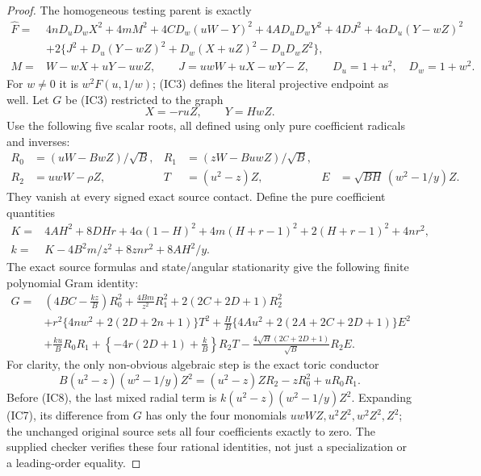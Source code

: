 \begin{proof}
The homogeneous testing parent is exactly
\begin{align*}
 \widehat F={}&4nD_uD_wX^2+4mM^2+4CD_w(uW-Y)^2
     +4AD_uD_wY^2+4DJ^2+4\alpha D_u(Y-wZ)^2\\
 &+2\{J^2+D_u(Y-wZ)^2+D_w(X+uZ)^2-D_uD_wZ^2\},\\
 M={}&W-wX+uY-uwZ,\qquad
 J=uwW+uX-wY-Z,
 \qquad D_u=1+u^2,\quad D_w=1+w^2.
                                                               \tag{IC3}
\end{align*}
For $w\ne0$ it is $w^2F(u,1/w)$; (IC3) defines the literal
projective endpoint as well. Let $G$ be (IC3) restricted to the graph
\[
                         X=-ruZ,\qquad Y=HwZ.
\tag{IC4}
\]
Use the following five scalar roots, all defined using only pure
coefficient radicals and inverses:
\begin{align*}
 R_0&=(uW-BwZ)/\sqrt B,&
 R_1&=(zW-BuwZ)/\sqrt B,\\
 R_2&=uwW-\rho Z,&
 T&=(u^2-z)Z,&
 E&=\sqrt{BH}\,(w^2-1/y)Z.                               \tag{IC5}
\end{align*}
They vanish at every signed exact source contact. Define the pure
coefficient quantities
\begin{align*}
 K={}&4AH^2+8DHr+4\alpha(1-H)^2
      +4m(H+r-1)^2+2(H+r-1)^2+4nr^2,\\
 k={}&K-4B^2m/z^2+8znr^2+8AH^2/y.                      \tag{IC6}
\end{align*}
The exact source formulas and state/angular stationarity give the
following finite polynomial Gram identity:
\begin{align*}
G={}&\left(4BC-\frac{kz}{B}\right)R_0^2
     +\frac{4Bm}{z^2}R_1^2+2(2C+2D+1)R_2^2\\
 &+r^2\{4nw^2+2(2D+2n+1)\}T^2
  +\frac H B\{4Au^2+2(2A+2C+2D+1)\}E^2\\
 &+\frac{ku}{B}R_0R_1
  +\left\{-4r(2D+1)+\frac{k}{B}\right\}R_2T
  -\frac{4\sqrt H(2C+2D+1)}{\sqrt B}R_2E.                   \tag{IC7}
\end{align*}
For clarity, the only non-obvious algebraic step is the exact toric
conductor
\[
 B(u^2-z)(w^2-1/y)Z^2
 =(u^2-z)ZR_2-zR_0^2+uR_0R_1.                         \tag{IC8}
\]
Before (IC8), the last mixed radial term is
$k(u^2-z)(w^2-1/y)Z^2$. Expanding (IC7), its difference from
$G$ has only the four monomials $uwWZ,u^2Z^2,w^2Z^2,Z^2$;
the unchanged original source sets all four coefficients exactly to
zero. The supplied checker verifies these four rational identities,
not just a specialization or a leading-order equality.


\end{proof}
